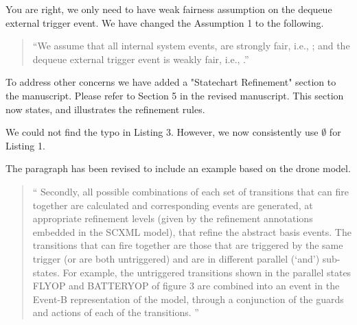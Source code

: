 \documentclass{response}
\begin{document}
\begin{response}
  You are right, we only need to have weak fairness assumption on the
  dequeue external trigger event. We have changed the Assumption 1 to
  the following.  
  \begin{quote}
    ``We assume that all internal system events, \mbox{}
    are strongly fair, i.e., \mbox{}; and the
    dequeue external trigger event is weakly fair, i.e.,
    \mbox{}.''
  \end{quote}
\end{response}

\begin{comment}{Reviewer \#1}
• p.2 The three rules are not at the same level. The first ones are expressed 
explicitely in terms of Event-B refinement features, while the third one 
addresses statecharts.
\end{comment}

\begin{response}
  To address other concerns we have added a "Statechart Refinement" section 
  to the manuscript. Please refer to Section 5 in the revised manuscript.
  This section now states, and illustrates the refinement rules.
\end{response}


\begin{comment}{Reviewer \#1}
• p. 10 typo? listing 3 l. 10 \emptyset
\end{comment}

\begin{response}
  We could not find the typo in Listing 3. However, we now
  consistently use $\emptyset$ for Listing 1.
\end{response}

\begin{comment}{Reviewer \#1}
• p.13 Could you illustrate the sentence all possible combinations of each
set of transitions that can fire together are calculated and corresponding
events are generated, at appropriate refinement levels.
\end{comment}

\begin{response}
  The paragraph has been revised to include an example based on the drone model.
  \begin{quote}
    `` Secondly, all possible combinations of each set of transitions that can
    fire together are calculated and corresponding events are generated, at
    appropriate refinement levels (given by the refinement annotations
    embedded in the SCXML model), that refine the abstract basis events. The
    transitions that can fire together are those that are triggered by the same
    trigger (or are both untriggered) and are in different parallel (‘and’)
    sub-states. For example, the untriggered transitions shown in the parallel
    states FLYOP and BATTERYOP of figure 3 are combined into an event in the Event-B 
    representation of the model, through a conjunction of the guards and actions 
    of each of the transitions.  ''
  \end{quote}
\end{response}
\end{document}
